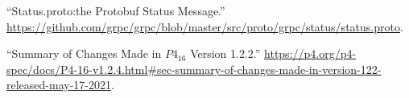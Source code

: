 \documentclass[11pt]{article}
\begin{document}
{{\begin{thebibliography}{44}
\mdbibitemlabel{{}[32]}\textquotedblleft{}Status.proto:the Protobuf Status Message.\textquotedblright{} \href{https://github.com/grpc/grpc/blob/master/src/proto/grpc/status/status.proto}{{\ttfamily https://\hspace{0pt}github.\hspace{0pt}com/\hspace{0pt}grpc/\hspace{0pt}grpc/\hspace{0pt}blob/\hspace{0pt}master/\hspace{0pt}src/\hspace{0pt}proto/\hspace{0pt}grpc/\hspace{0pt}status/\hspace{0pt}status.\hspace{0pt}proto}}.\label{protostatus}%

\mdbibitemlabel{{}[33]}\textquotedblleft{}Summary of Changes Made in $P4_{16}$ Version 1.2.2.\textquotedblright{} \href{https://p4.org/p4-spec/docs/P4-16-v1.2.4.html\%23sec-summary-of-changes-made-in-version-122-released-may-17-2021}{{\ttfamily https://\hspace{0pt}p4.\hspace{0pt}org/\hspace{0pt}p4-\hspace{0pt}spec/\hspace{0pt}docs/\hspace{0pt}P4-\hspace{0pt}16-\hspace{0pt}v1.\hspace{0pt}2.\hspace{0pt}4.\hspace{0pt}html\#\hspace{0pt}sec-\hspace{0pt}summary-\hspace{0pt}of-\hspace{0pt}changes-\hspace{0pt}made-\hspace{0pt}in-\hspace{0pt}version-\hspace{0pt}122-\hspace{0pt}released-\hspace{0pt}may-\hspace{0pt}17-\hspace{0pt}2021}}.\label{p4revisions122}%


\end{thebibliography}}}
\end{document}
